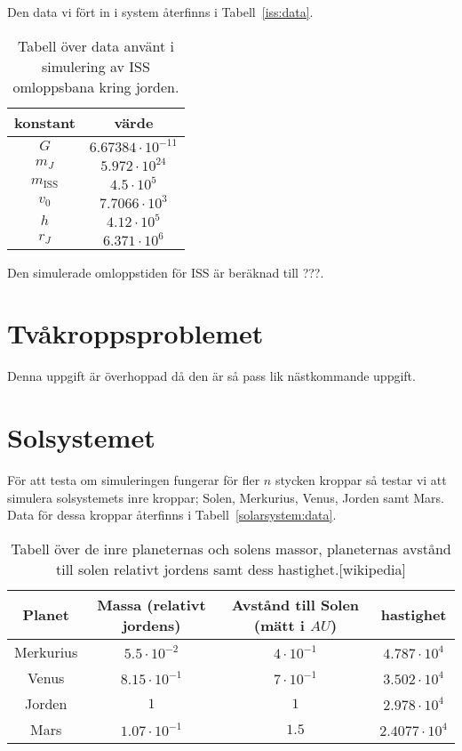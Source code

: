 \documentclass[a4]{article}
\begin{document}
Den data vi fört in i system återfinns i Tabell~\vref{iss:data}.
\begin{table}
\begin{center}
\begin{tabular}{c|c}
	konstant & värde \\
	\hline
	$G$       &  $6.67384 \cdot 10^{-11}$ \\
	$m_J$     &  $5.972 \cdot 10^{24}$ \\
	$m_{\mathrm{ISS}}$ &  $4.5 \cdot 10^5$ \\
	$v_0$     &  $7.7066 \cdot 10^3$ \\
	$h$       &  $4.12 \cdot 10^5$ \\
	$r_J$     &  $6.371 \cdot 10^6$
\end{tabular}
\caption{Tabell över data använt i simulering av ISS omloppsbana kring jorden.}
\label{iss:data}
\end{center}
\end{table}

Den simulerade omloppstiden för ISS är beräknad till ???.

\section{Tvåkroppsproblemet}
Denna uppgift är överhoppad då den är så pass lik nästkommande uppgift.

\section{Solsystemet}
För att testa om simuleringen fungerar för fler $n$ stycken kroppar så testar
vi att simulera solsystemets inre kroppar; Solen, Merkurius, Venus, Jorden samt
Mars.
Data för dessa kroppar återfinns i Tabell~\vref{solarsystem:data}.

\begin{table}
\begin{center}
\begin{tabular}{c|c|c|c}
	Planet    & Massa (relativt jordens) & Avstånd till Solen (mätt i $AU$) & hastighet\\
	\hline
	Merkurius & $5.5 \cdot 10^{-2}$  & $4 \cdot 10^{-1}$  &  $4.787 \cdot 10^4$ \\
	Venus     & $8.15 \cdot 10^{-1}$ & $7 \cdot 10^{-1}$  &  $3.502 \cdot 10^4$ \\ 
	Jorden    & $1$                  & $1$                &  $2.978 \cdot 10^4$ \\
	Mars      & $1.07 \cdot 10^{-1}$ & $1.5$              &  $2.4077 \cdot 10^4$
\end{tabular}
\caption{
	Tabell över de inre planeternas och solens massor, planeternas avstånd till
	solen relativt jordens samt dess hastighet.[wikipedia]
}
\label{solarsystem:data}
\end{center}
\end{table}
	
\end{document}
